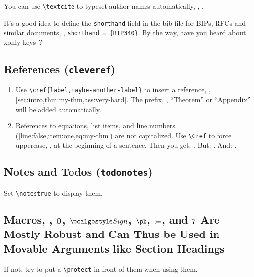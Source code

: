 You can use \verb|\textcite| to typeset author names automatically, \eg, \textcite{CCS:BelNev06,EPRINT:NicRufSeu20}.

It's a good idea to define the \texttt{shorthand} field in the bib file for BIPs, RFCs and similar documents, \eg, \verb|shorthand = {BIP340}|. By the way, have you heard about xonly keys~\cite{add:bip-schnorr}?


\subsection{References (\texttt{cleveref})}
\begin{enumerate}
  \item\label{item:one}
        Use \verb|\cref{label,maybe-another-label}| to insert a reference, \eg, \cref{sec:intro,thm:my-thm,ass:very-hard}.
        The prefix, \eg, ``Theorem'' or ``Appendix'' will be added automatically.
  \item
        References to equations, list items, and line numbers (\cref{line:false,item:one,eq:my-thm}) are not capitalized.
        Use \verb|\Cref| to force uppercase, \eg, at the beginning of a sentence.
        Then you get:
        . But: . And: .
\end{enumerate}


\subsection{Notes and Todos (\texttt{todonotes})}
Set \verb|\notestrue| to display them.


\subsection{Macros, \eg, $\btcsym$, $\algo{Sign}$, $\pk$, $\coloneq$, and $\xmark$ Are Mostly Robust and Can Thus be Used in Movable Arguments like Section Headings}
If not, try to put a \verb|\protect| in front of them when using them.



